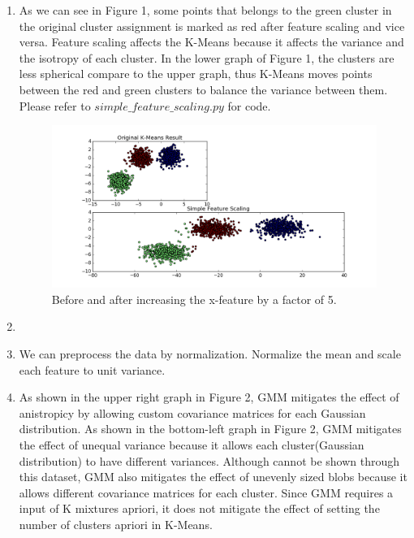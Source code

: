 \documentclass{article}
\begin{document}
\begin{enumerate}
\begin{enumerate}
\begin{itemize}
        \end{itemize}
    \item
        As we can see in Figure 1, some points that belongs to the green cluster in the original cluster assignment is marked as red after feature scaling and vice versa. Feature scaling affects the K-Means because it affects the variance and the isotropy of each cluster. In the lower graph of Figure 1, the clusters are less spherical compare to the upper graph, thus K-Means moves points between the red and green clusters to balance the variance between them. Please refer to $simple\_feature\_scaling.py$ for code.
        \begin{figure}[h]
            \includegraphics[width=.8\linewidth]{figure_1.png}
            \caption{Before and after increasing the x-feature by a factor of 5.}
            \label{fig:graph1}
        \end{figure}
    \item
    \item
        We can preprocess the data by normalization. Normalize the mean and scale each feature to unit variance.
    \item
        As shown in the upper right graph in Figure 2, GMM mitigates the effect of anistropicy by allowing custom covariance matrices for each Gaussian distribution. As shown in the bottom-left graph in Figure 2, GMM mitigates the effect of unequal variance because it allows each cluster(Gaussian distribution) to have different variances. Although cannot be shown through this dataset, GMM also mitigates the effect of unevenly sized blobs because it allows different covariance matrices for each cluster. Since GMM requires a input of K mixtures apriori, it does not mitigate the effect of setting the number of clusters apriori in K-Means.
        \begin{figure}[h]

\end{figure}
\end{enumerate}
\end{enumerate}
\end{document}

